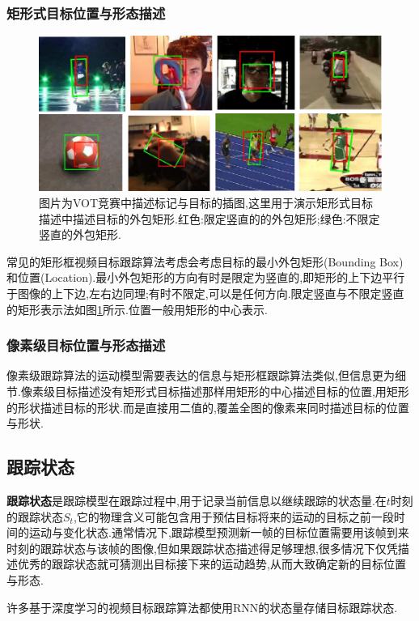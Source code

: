 \subsubsection{矩形式目标位置与形态描述}
\par
\begin{figure}[htbp!]
    \centering
    \includegraphics[width = 1.\textwidth]{chap/img/overlap_examples.pdf}
    \caption{图片为VOT竞赛中描述标记与目标的插图\supercite{VOT_TPAMI},这里用于演示矩形式目标描述中描述目标的外包矩形.红色:限定竖直的的外包矩形;绿色:不限定竖直的外包矩形.}
    \label{fig:bunding_boxes}
\end{figure}
\par
常见的矩形框视频目标跟踪算法考虑会考虑目标的最小外包矩形(Bounding Box)和位置(Location).最小外包矩形的方向有时是限定为竖直的,即矩形的上下边平行于图像的上下边,左右边同理;有时不限定,可以是任何方向.限定竖直与不限定竖直的矩形表示法如图\ref{fig:bunding_boxes}所示.位置一般用矩形的中心表示.
\par
\subsubsection{像素级目标位置与形态描述}
像素级跟踪算法的运动模型需要表达的信息与矩形框跟踪算法类似,但信息更为细节.像素级目标描述没有矩形式目标描述那样用矩形的中心描述目标的位置,用矩形的形状描述目标的形状.而是直接用二值的,覆盖全图的像素来同时描述目标的位置与形状.

\subsection{跟踪状态} \label{section:tracking_state}
\textbf{跟踪状态}是跟踪模型在跟踪过程中,用于记录当前信息以继续跟踪的状态量.在$t$时刻的跟踪状态$S_t$,它的物理含义可能包含用于预估目标将来的运动的目标之前一段时间的运动与变化状态.通常情况下,跟踪模型预测新一帧的目标位置需要用该帧到来时刻的跟踪状态与该帧的图像,但如果跟踪状态描述得足够理想,很多情况下仅凭描述优秀的跟踪状态就可猜测出目标接下来的运动趋势,从而大致确定新的目标位置与形态.
\par
许多基于深度学习的视频目标跟踪算法都使用RNN的状态量存储目标跟踪状态.
\par

